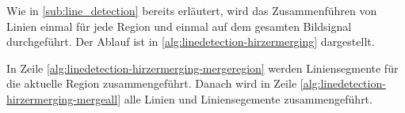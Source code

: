 Wie in \autoref{sub:line_detection} bereits erläutert, wird das Zusammenführen von Linien einmal für jede Region und
 einmal auf dem gesamten Bildsignal durchgeführt. Der Ablauf ist in \autoref{alg:linedetection-hirzermerging}
 dargestellt.



In Zeile \ref{alg:linedetection-hirzermerging-mergeregion} werden Liniensegmente für die aktuelle Region
 zusammengeführt. Danach wird in Zeile \ref{alg:linedetection-hirzermerging-mergeall} alle Linien und Liniensegemente zusammengeführt.

